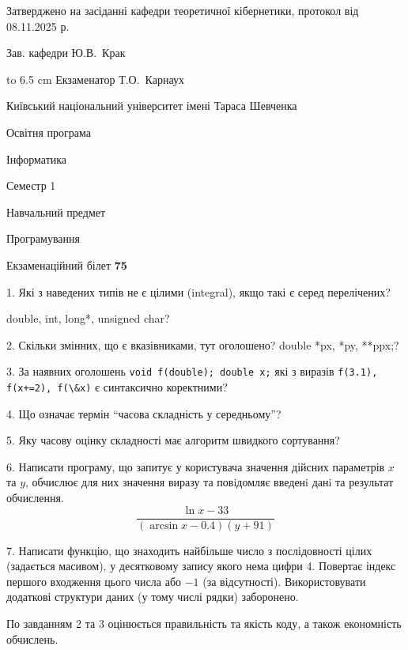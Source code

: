 \documentclass[12pt, ukrainian]{article}
\def\code#1{\Verb!#1!}
\begin{document}
{\smallskip\smallskip \begin {scriptsize} Затверджено на засіданні кафедри теоретичної кібернетики, протокол   від   08.11.2025 р.\par\smallskip\smallskip\smallskip\smallskip
{\parbox {6.5 cm} {Зав. кафедри \dotfill Ю.В.~Крак}}\hspace {0.7cm} {\hbox to 6.5 cm { Екзаменатор \dotfill Т.О.~Карнаух}} \end{scriptsize}}
\newpage
{{\begin {scriptsize}\par
{ \center  Київський національний університет імені Тараса Шевченка \par}
{\parbox {5 cm}{Освітня програма \hfill}{\parbox {7 cm}{Інформатика\hfill}}\parbox {6 cm}{\hfill Семестр 1}}\par
{\parbox {5 cm} {Навчальний предмет \hfill}\parbox {7 cm}{Програмування \hfill}\parbox {6cm}{\hfill}\par}\vspace{-15pt} \end{scriptsize}}{\center Екзаменаційний білет \No \textbf { 75 }\par}}
{%
1. Які з наведених типів не є цілими (integral), якщо такі є серед перелічених?

double, int, long*, unsigned char?
\par
\vspace{2mm}
2. Скільки змінних, що є вказівниками, тут оголошено?
double *px, *py, **ppx;?
\par
\vspace{2mm}
3. За наявних оголошень \code{void f(double); double x;} які з виразів \code{f(3.1), f(x+=2), f(\&x)} є синтаксично коректними?
\par
\vspace{2mm}
4. Що означає термін ``часова складність у середньому''?
\par
\vspace{2mm}
5. Яку часову оцінку складності має алгоритм швидкого сортування?
\par
\vspace{2mm}
6. Написати програму, що запитує у користувача значення дійсних параметрів $x$ та $y$, обчислює для них значення виразу та повiдомляє введенi данi та результат обчислення.
$$\frac{\ln x - 33}{(\arcsin x - 0.4) (y + 91)}$$ 

\par
7. Написати функцію, що знаходить найбільше число з послідовності цілих (задається масивом), у десятковому запису якого нема цифри 4. Повертає індекс першого входження цього числа або $-1$ (за відсутності). Використовувати додаткові структури даних (у тому числі рядки) заборонено.

По завданням 2 та 3 оцінюється правильність та якість коду, а також економність обчислень.

}
\end{document}
